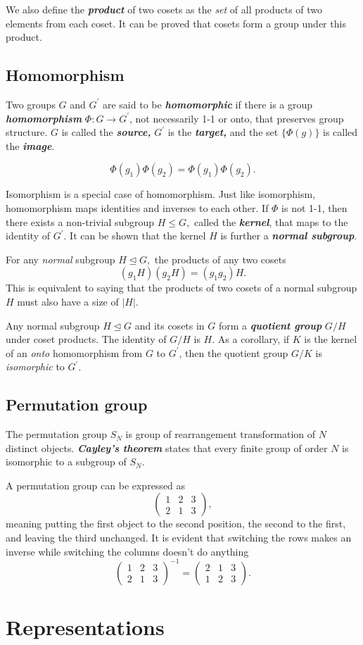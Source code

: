 \documentclass{article}
\begin{document}
We also define the \textit{\textbf{product}} of two cosets as the \textit{set} of all products of two elements from each coset. It can be proved that cosets form a group under this product. 

\subsection{Homomorphism}
Two groups $G$ and $G^\prime $ are said to be \textit{\textbf{homomorphic}} if there is a group \textit{\textbf{homomorphism}} $\Phi: G\to G^\prime$, not necessarily 1-1 or onto, that preserves group structure. $G$ is called the \textit{\textbf{source,}} $G^\prime $ is the \textit{\textbf{target,}} and the set $\{\Phi(g)\}$ is called the \textit{\textbf{image}}. 

\[
    \Phi(g_1) \Phi(g_2) = \Phi(g_1) \Phi(g_2).
\]

Isomorphism is a special case of homomorphism. Just like isomorphism, homomorphism maps identities and inverses to each other. If $\Phi$ is not 1-1, then there exists a non-trivial subgroup $H \leq G,$ called the \textit{\textbf{kernel}}, that maps to the identity of $G^\prime.$ It can be shown that the kernel $H$ is further a \textit{\textbf{normal subgroup}}. 

For any \textit{normal} subgroup $H\unlhd G,$ the products of any two cosets
\[
    (g_1 H)(g_2 H) = (g_1 g_2) H.
\]
This is equivalent to saying that the products of two cosets of a normal subgroup $H$ must also have a size of $\left\vert H \right\vert.$ 

Any normal subgroup $H \unlhd G$ and its cosets in $G$ form a \textit{\textbf{quotient group}} $G/H$ under coset products. The identity of $G / H$ is $H.$ 
As a corollary, if $K$ is the kernel of an \textit{onto} homomorphism from $G$ to $G^\prime$, then the quotient group $G / K$ is \textit{isomorphic} to $G^\prime.$

\subsection{Permutation group}
The permutation group $S_N$ is group of rearrangement transformation of $N$ distinct objects. \textit{\textbf{Cayley's theorem}} states that every finite group of order $N$ is isomorphic to a subgroup of $S_N.$ 

A permutation group can be expressed as
\[
    \begin{pmatrix}
        1 & 2 & 3 \\ 
        2 & 1 & 3 
    \end{pmatrix},
\]
meaning putting the first object to the second position, the second to the first, and leaving the third unchanged. It is evident that switching the rows makes an inverse while switching the columns doesn't do anything
\[
    \begin{pmatrix}
        1 & 2 & 3 \\ 
        2 & 1 & 3
    \end{pmatrix}^{-1} 
    = 
    \begin{pmatrix}
        2 & 1 & 3 \\ 
        1 & 2 & 3
    \end{pmatrix}.
\]
\section{Representations}
\end{document}
